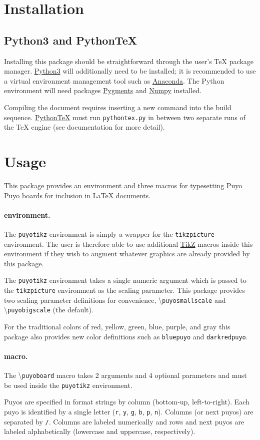 \documentclass{article}
\newcommand{\latex}{\LaTeX\xspace}
\newcommand{\tex}{\TeX\xspace}
\newcommand{\link}[2]{\href{#1}{\color{darkbluepuyo}#2}}
\newcommand{\code}[1]{{\small\texttt{#1}}}
\newcommand{\cmd}[1]{{\small\textbackslash\texttt{#1}}}
\newcommand{\codepar}[2]{\paragraph{\color{darkgreenpuyo}\code{#1} #2.}\mbox{}\par}
\newcommand{\python}{\link{https://www.python.org/download/releases/3.0/}{Python3}\xspace}
\newcommand{\anaconda}{\link{https://www.anaconda.com/products/individual}{Anaconda}\xspace}
\newcommand{\pypygments}{\link{https://pygments.org/}{Pygments}\xspace}
\newcommand{\pynumpy}{\link{https://numpy.org/}{Numpy}\xspace}
\newcommand{\pythontex}{\link{https://ctan.org/pkg/pythontex?lang=en}{Python\tex}\xspace}
\newcommand{\tikzpgf}{\link{https://ctan.org/pkg/pgf?lang=en}{TikZ}\xspace}
\begin{document}
\section{Installation}
\subsection{Python3 and PythonTeX}
Installing this package should be straightforward through the user's \tex package manager. \python will additionally need to be installed; it is recommended to use a virtual environment management tool such as \anaconda. The Python environment will need packages \pypygments and \pynumpy installed.\par
Compiling the document requires inserting a new command into the build sequence. \pythontex must run \code{pythontex.py} in between two separate runs of the \tex engine (see documentation for more detail).

\section{Usage}
This package provides an environment and three macros for typesetting Puyo Puyo boards for inclusion in \latex documents.

\codepar{puyotikz}{environment}
The \code{puyotikz} environment is simply a wrapper for the \code{tikzpicture} environment. The user is therefore able to use additional \tikzpgf macros inside this environment if they wish to augment whatever graphics are already provided by this package.\par
The \code{puyotikz} environment takes a single numeric argument which is passed to the \code{tikzpicture} environment as the scaling parameter. This package provides two scaling parameter definitions for convenience, \cmd{puyosmallscale} and \cmd{puyobigscale} (the default).

\begin{puyolisting}
	\begin{puyotikz}[\puyosmallscale]
	\end{puyotikz}
\end{puyolisting}

For the traditional colors of red, yellow, green, blue, purple, and gray this package also provides new color definitions such as \code{bluepuyo} and \code{darkredpuyo}.

\pagebreak
\codepar{puyoboard}{macro}
The \cmd{puyoboard} macro takes 2 arguments and 4 optional parameters and must be used inside the \code{puyotikz} environment.\par
Puyos are specified in format strings by column (bottom-up, left-to-right). Each puyo is identified by a single letter (\code{r}, \code{y}, \code{g}, \code{b}, \code{p}, \code{n}). Columns (or next puyos) are separated by \code{/}. Columns are labeled numerically and rows and next puyos are labeled alphabetically (lowercase and uppercase, respectively).
\end{document}
